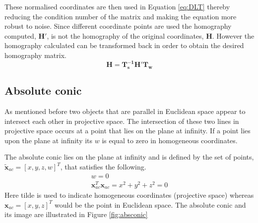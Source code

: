 \documentclass[12pt,oneside,openany,a4paper, %
english, %
masters-t, goldenblock]{usthesis}
\begin{document}
These normalised coordinates are then used in Equation \ref{eq:DLT} thereby reducing the condition number of the matrix and making the equation more robust to noise. Since different coordinate points are used the homography computed, $\bm{H'}$, is not the homography of the original coordinates, $\bm{H}$. However the homography calculated can be transformed back in order to obtain the desired homography matrix.
\begin{equation}
  \bm{H} = \bm{T_{s}^{-1}} \bm{H'} \bm{T_{w}}
\end{equation}

\subsection{Absolute conic}
\label{sec: abs conic}
As mentioned before two objects that are parallel in Euclidean space appear to intersect each other in projective space. The intersection of these two lines in projective space occurs at a point that lies on the plane at infinity. If a point lies upon the plane at infinity its $w$ is equal to zero in homogeneous coordinates.

The absolute conic lies on the plane at infinity and is defined by the set of points, $\tilde{\bm{x}}_{ac} = [x, y, z, w]^T$, that satisfies the following. 
\begin{align}
  w = 0 \\
  \bm{x}_{ac}^T \bm{x}_{ac}=x^2 + y^2 + z^2 = 0 
  \label{eq:conditions of absolute conic}
\end{align}
Here tilde is used to indicate homogeneous coordinates (projective space) whereas $\bm{x}_{ac} = [x, y, z]^T$ would be the point in Euclidean space. The absolute conic and its image are illustrated in Figure \ref{fig:absconic}
\end{document}
